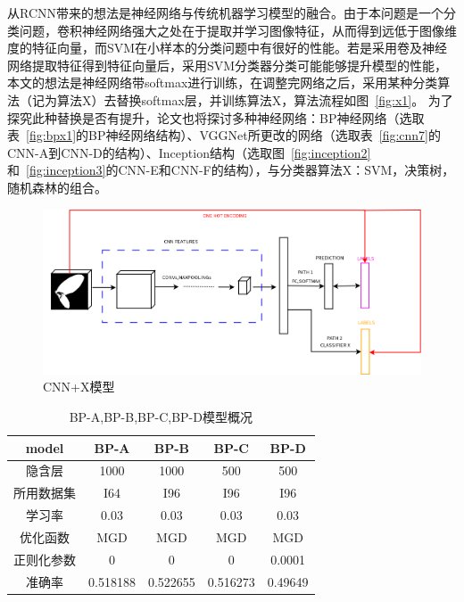 从RCNN带来的想法是神经网络与传统机器学习模型的融合。由于本问题是一个分类问题，卷积神经网络强大之处在于提取并学习图像特征，从而得到远低于图像维度的特征向量，而SVM在小样本的分类问题中有很好的性能。若是采用卷及神经网络提取特征得到特征向量后，采用SVM分类器分类可能能够提升模型的性能，本文的想法是神经网络带softmax进行训练，在调整完网络之后，采用某种分类算法（记为算法X）去替换softmax层，并训练算法X，算法流程如图~\ref{fig:x1}。
为了探究此种替换是否有提升，论文也将探讨多种神经网络：BP神经网络（选取表~\ref{fig:bpx1}的BP神经网络结构）、VGGNet所更改的网络（选取表~\ref{fig:cnn7}的CNN-A到CNN-D的结构）、Inception结构（选取图~\ref{fig:inception2}和~\ref{fig:inception3}的CNN-E和CNN-F的结构），与分类器算法X：SVM，决策树，随机森林的组合。

\begin{figure}[htb]
\centering
\includegraphics[scale=0.4]{../figures/rcnn_4.png} 
\caption{CNN+X模型}
\label{fig:rcnn2}
\end{figure}

\begin{table}[htb]
\centering
\caption{BP-A,BP-B,BP-C,BP-D模型概况}
\begin{tabular}{ccccc}
\toprule[2pt]
model & BP-A & BP-B & BP-C & BP-D \\ 
\midrule[1pt]
隐含层 & 1000 & 1000 & 500 & 500 \\ 
所用数据集 & I64 & I96 & I96 & I96 \\ 
学习率 & 0.03 & 0.03 & 0.03 & 0.03 \\ 
优化函数 & MGD & MGD & MGD & MGD \\ 
正则化参数 & 0 & 0 & 0 & 0.0001 \\ 
\midrule[1pt]
准确率 & 0.518188 & 0.522655 & 0.516273 & 0.49649 \\ 
\bottomrule[2pt]
\end{tabular} 
\label{table:bpx2}
\end{table}

